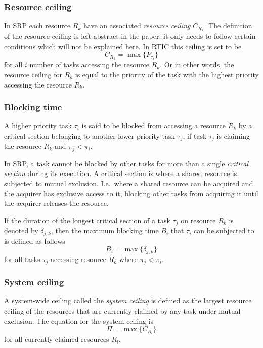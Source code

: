\subsubsection{Resource ceiling}
\label{theory:srp:definitions:resource}
In SRP each resource $R_k$ have an associated \emph{resource ceiling}
$C_{R_k}$. The definition of the resource ceiling is left abstract in the
paper\cite{srp}: it only needs to follow certain conditions which will not be
explained here. In RTIC this ceiling is set to be
\begin{equation}
    C_{R_k} = \max\{P_{\tau_i}\}
\end{equation}
for all $i$ number of tasks accessing the resource $R_k$. Or in other words,
the resource ceiling for $R_k$ is equal to the priority of the task with the
highest priority accessing the resource $R_k$.

\subsubsection{Blocking time}
\label{theory:srp:definitions:blocking}
A higher priority task $\tau_i$ is said to be blocked from accessing a resource
$R_k$ by a critical section belonging to another lower priority task $\tau_j$,
if task $\tau_j$ is claiming the resource $R_k$ and $\pi_j < \pi_i$.

In SRP, a task cannot be blocked by other tasks for more than a single
\emph{critical section} during its execution. A critical section is where a
shared resource is subjected to mutual exclusion. I.e.\ where a shared resource
can be acquired and the acquirer has exclusive access to it, blocking other
tasks from acquiring it until the acquirer releases the resource.

If the duration of the longest critical section of a task $\tau_j$ on resource
$R_k$ is denoted by $\delta_{j,k}$, then the maximum blocking time $B_i$
that $\tau_i$ can be subjected to is defined as follows
\begin{equation}
    B_i = \max\{\delta_{j,k}\}
\end{equation}
for all tasks $\tau_j$ accessing resource $R_k$ where $\pi_j < \pi_i$.

\subsubsection{System ceiling}
\label{theory:srp:definitions:system}
A system-wide ceiling called the \emph{system ceiling} is defined as the
largest resource ceiling of the resources that are currently claimed by
any task under mutual exclusion. The equation for the system ceiling is
\begin{equation}
    \Pi = \max\{C_{R_l}\}
\end{equation}
for all currently claimed resources $R_l$.

